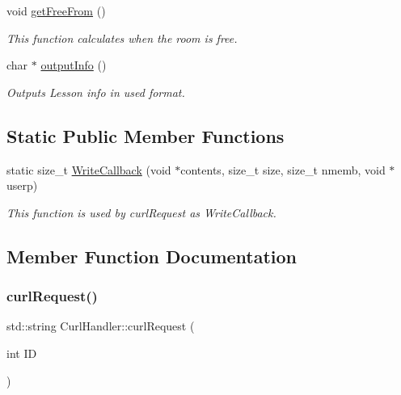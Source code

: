 \begin{DoxyCompactItemize}
void \hyperlink{classCurlHandler_a43b8d7b4ec2866c34820baa71236a15a}{get\+Free\+From} ()
\begin{DoxyCompactList}\small\item\em This function calculates when the room is free. \end{DoxyCompactList}\item 
char $\ast$ \hyperlink{classCurlHandler_a5d840e40c7e2d11297514947e957d542}{output\+Info} ()
\begin{DoxyCompactList}\small\item\em Outputs Lesson info in used format. \end{DoxyCompactList}\end{DoxyCompactItemize}
\subsection*{Static Public Member Functions}
\begin{DoxyCompactItemize}
\item 
static size\+\_\+t \hyperlink{classCurlHandler_aff816fc825c4ad52b377c808a900d07d}{Write\+Callback} (void $\ast$contents, size\+\_\+t size, size\+\_\+t nmemb, void $\ast$userp)
\begin{DoxyCompactList}\small\item\em This function is used by curl\+Request as Write\+Callback. \end{DoxyCompactList}\end{DoxyCompactItemize}


\subsection{Member Function Documentation}
\mbox{\label{classCurlHandler_a3b115e8ef11a96743b49797b4025b3a0}} 
\subsubsection{\texorpdfstring{curl\+Request()}{curlRequest()}}
{\footnotesize\ttfamily std\+::string Curl\+Handler\+::curl\+Request (\begin{DoxyParamCaption}\item[{int}]{ID }\end{DoxyParamCaption})}



